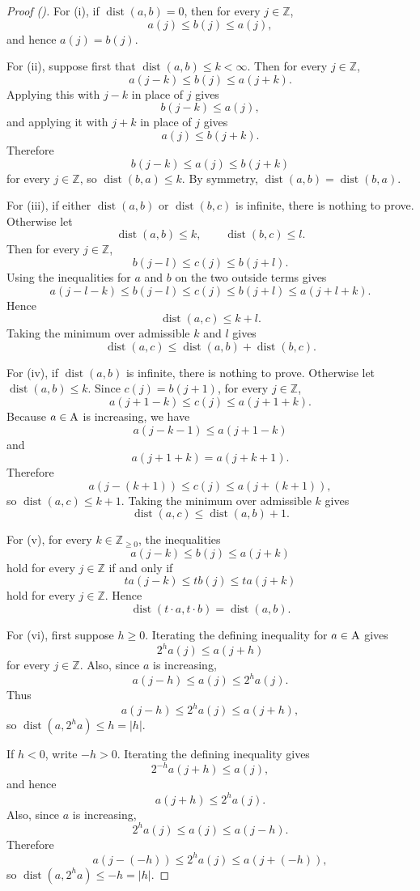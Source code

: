 \documentclass[12pt,reqno]{amsart}
\newcommand{\auto}{{({\tiny\faCar})}}
\theoremstyle{plain}
\numberwithin{equation}{section}
\theoremstyle{remark}
\newcommand{\Z}{{\mathbb Z}}
\DeclareMathOperator{\dist}{dist}
\begin{document}
\begin{proof}[Proof \auto]
For (i), if $\dist(a,b)=0$, then for every $j\in\Z$,
\[
 a(j)\le b(j)\le a(j),
\]
and hence $a(j)=b(j)$.

For (ii), suppose first that $\dist(a,b)\le k<\infty$. Then for every $j\in\Z$,
\[
 a(j-k)\le b(j)\le a(j+k).
\]
Applying this with $j-k$ in place of $j$ gives
\[
 b(j-k)\le a(j),
\]
and applying it with $j+k$ in place of $j$ gives
\[
 a(j)\le b(j+k).
\]
Therefore
\[
 b(j-k)\le a(j)\le b(j+k)
\]
for every $j\in\Z$, so $\dist(b,a)\le k$. By symmetry, $\dist(a,b)=\dist(b,a)$.

For (iii), if either $\dist(a,b)$ or $\dist(b,c)$ is infinite, there is nothing to prove. Otherwise let
\[
 \dist(a,b)\le k,\qquad \dist(b,c)\le l.
\]
Then for every $j\in\Z$,
\[
 b(j-l)\le c(j)\le b(j+l).
\]
Using the inequalities for $a$ and $b$ on the two outside terms gives
\[
 a(j-l-k)\le b(j-l)\le c(j)\le b(j+l)\le a(j+l+k).
\]
Hence
\[
 \dist(a,c)\le k+l.
\]
Taking the minimum over admissible $k$ and $l$ gives
\[
 \dist(a,c)\le \dist(a,b)+\dist(b,c).
\]

For (iv), if $\dist(a,b)$ is infinite, there is nothing to prove. Otherwise let $\dist(a,b)\le k$. Since $c(j)=b(j+1)$, for every $j\in\Z$,
\[
 a(j+1-k)\le c(j)\le a(j+1+k).
\]
Because $a\in{\rm A}$ is increasing, we have
\[
 a(j-k-1)\le a(j+1-k)
\]
and
\[
 a(j+1+k)=a(j+k+1).
\]
Therefore
\[
 a(j-(k+1))\le c(j)\le a(j+(k+1)),
\]
so $\dist(a,c)\le k+1$. Taking the minimum over admissible $k$ gives
\[
 \dist(a,c)\le \dist(a,b)+1.
\]

For (v), for every $k\in\Z_{\ge 0}$, the inequalities
\[
 a(j-k)\le b(j)\le a(j+k)
\]
hold for every $j\in\Z$ if and only if
\[
 t a(j-k)\le t b(j)\le t a(j+k)
\]
hold for every $j\in\Z$. Hence
\[
 \dist(t\cdot a,t\cdot b)=\dist(a,b).
\]

For (vi), first suppose $h\ge 0$. Iterating the defining inequality for $a\in{\rm A}$ gives
\[
 2^h a(j)\le a(j+h)
\]
for every $j\in\Z$. Also, since $a$ is increasing,
\[
 a(j-h)\le a(j)\le 2^h a(j).
\]
Thus
\[
 a(j-h)\le 2^h a(j)\le a(j+h),
\]
so $\dist(a,2^h a)\le h=|h|$.

If $h<0$, write $-h>0$. Iterating the defining inequality gives
\[
 2^{-h}a(j+h)\le a(j),
\]
and hence
\[
 a(j+h)\le 2^h a(j).
\]
Also, since $a$ is increasing,
\[
 2^h a(j)\le a(j)\le a(j-h).
\]
Therefore
\[
 a(j-(-h))\le 2^h a(j)\le a(j+(-h)),
\]
so $\dist(a,2^h a)\le -h=|h|$.

\end{proof}
\end{document}
